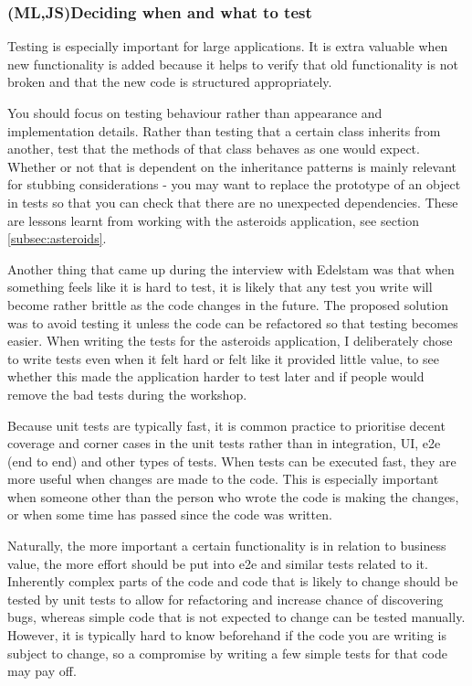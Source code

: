 \documentclass[11pt]{article}
\begin{document}
\subsubsection{(ML,JS)Deciding when and what to test}

Testing is especially important for large applications. It is extra valuable when new functionality is added because it helps to verify that old functionality is not broken and that the new code is structured appropriately. \cite[questions~6-7]{Stenmark}

You should focus on testing behaviour rather than appearance and implementation details. \cite[question~10]{Edelstam} Rather than testing that a certain class inherits from another, test that the methods of that class behaves as one would expect. Whether or not that is dependent on the inheritance patterns is mainly relevant for stubbing considerations - you may want to replace the prototype of an object in tests so that you can check that there are no unexpected dependencies. These are lessons learnt from working with the asteroids application, see section \ref{subsec:asteroids}. 

Another thing that came up during the interview with Edelstam was that when something feels like it is hard to test, it is likely that any test you write will become rather brittle as the code changes in the future. The proposed solution was to avoid testing it unless the code can be refactored so that testing becomes easier. \cite[question~30]{Edelstam} When writing the tests for the asteroids application, I deliberately chose to write tests even when it felt hard or felt like it provided little value, to see whether this made the application harder to test later and if people would remove the bad tests during the workshop.

Because unit tests are typically fast, it is common practice to prioritise decent coverage and corner cases in the unit tests rather than in integration, UI, e2e (end to end) and other types of tests. When tests can be executed fast, they are more useful when changes are made to the code. This is especially important when someone other than the person who wrote the code is making the changes, or when some time has passed since the code was written. \cite[questions~22-24]{Stenmark}

Naturally, the more important a certain functionality is in relation to business value, the more effort should be put into e2e and similar tests related to it. Inherently complex parts of the code and code that is likely to change should be tested by unit tests to allow for refactoring and increase chance of discovering bugs, whereas simple code that is not expected to change can be tested manually. However, it is typically hard to know beforehand if the code you are writing is subject to change, so a compromise by writing a few simple tests for that code may pay off. \cite[questions~28-29 and 33]{Stenmark}
\end{document}
